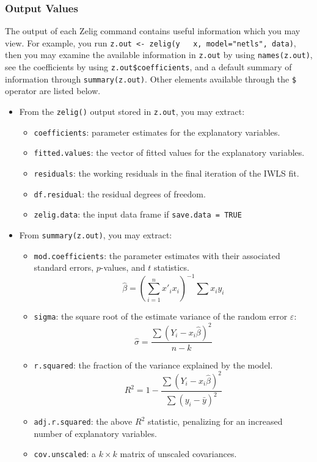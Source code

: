 \subsubsection{Output Values}

The output of each Zelig command contains useful information which you
may view. For example, you run {\tt z.out <- zelig(y ~ x,
model="netls", data)}, then you may examine the available information
in {\tt z.out} by using {\tt names(z.out)}, see the coefficients by
using {\tt z.out\$coefficients}, and a default summary of information
through {\tt summary(z.out)}. Other elements available through the
{\tt \$} operator are listed below. 
\begin{itemize}
\item From the {\tt zelig()} output stored in {\tt z.out}, you may extract:
\begin{itemize}
\item {\tt coefficients}: parameter estimates for the explanatory variables.
\item {\tt fitted.values}: the vector of fitted values for the explanatory variables.
\item {\tt residuals}: the working residuals in the final iteration of the IWLS fit. 
\item {\tt df.residual}: the residual degrees of freedom.
\item {\tt zelig.data}: the input data frame if {\tt save.data = TRUE}
\end{itemize}

\item From {\tt summary(z.out)}, you may extract:
\begin{itemize}
\item {\tt mod.coefficients}: the parameter estimates with their associated standard errors, $p$-values, and $t$ statistics. 
\begin{equation*}
\hat{\beta} = \left( \sum_{i = 1}^{n} x'_{i}x_{i}  \right)^{-1} \sum x_{i}y_{i}
\end{equation*}
\item {\tt sigma}: the square root of the estimate variance of the
random error $\varepsilon$:
\begin{equation*}
\hat{\sigma} = \frac{\sum (Y_{i} - x_{i} \hat{\beta} ) ^{2}}{n - k}
\end{equation*}
\item {\tt r.squared}: the fraction of the variance explained by the model.
\begin{equation*}
R^{2} = 1 - \frac{\sum (Y_{i} - x_{i} \hat{\beta} ) ^{2}}{\sum (y_{i}
- \bar{y})^{2}}
\end{equation*}
\item {\tt adj.r.squared}: the above $R^{2}$ statistic, penalizing for
an increased number of explanatory variables.  
\item {\tt cov.unscaled}: a $k \times k$ matrix of unscaled covariances. 
\end{itemize}


\end{itemize}
